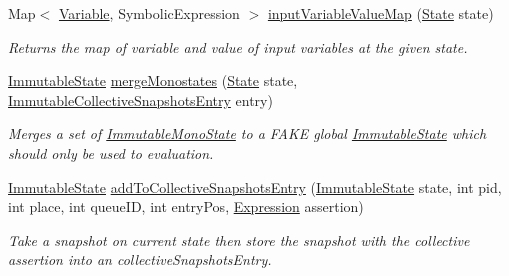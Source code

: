 \begin{DoxyCompactItemize}
\item 
Map$<$ \hyperlink{interfaceedu_1_1udel_1_1cis_1_1vsl_1_1civl_1_1model_1_1IF_1_1variable_1_1Variable}{Variable}, Symbolic\+Expression $>$ \hyperlink{interfaceedu_1_1udel_1_1cis_1_1vsl_1_1civl_1_1state_1_1IF_1_1StateFactory_a8f666801e5c6522fcdc81b508cf1e10d}{input\+Variable\+Value\+Map} (\hyperlink{interfaceedu_1_1udel_1_1cis_1_1vsl_1_1civl_1_1state_1_1IF_1_1State}{State} state)
\begin{DoxyCompactList}\small\item\em Returns the map of variable and value of input variables at the given state. \end{DoxyCompactList}\item 
\hyperlink{classedu_1_1udel_1_1cis_1_1vsl_1_1civl_1_1state_1_1common_1_1immutable_1_1ImmutableState}{Immutable\+State} \hyperlink{interfaceedu_1_1udel_1_1cis_1_1vsl_1_1civl_1_1state_1_1IF_1_1StateFactory_a71c4b5efdb8a18f3e9d6e724c0045d4f}{merge\+Monostates} (\hyperlink{interfaceedu_1_1udel_1_1cis_1_1vsl_1_1civl_1_1state_1_1IF_1_1State}{State} state, \hyperlink{classedu_1_1udel_1_1cis_1_1vsl_1_1civl_1_1state_1_1common_1_1immutable_1_1ImmutableCollectiveSnapshotsEntry}{Immutable\+Collective\+Snapshots\+Entry} entry)
\begin{DoxyCompactList}\small\item\em Merges a set of \hyperlink{}{Immutable\+Mono\+State} to a F\+A\+K\+E global \hyperlink{}{Immutable\+State} which should only be used to evaluation. \end{DoxyCompactList}\item 
\hyperlink{classedu_1_1udel_1_1cis_1_1vsl_1_1civl_1_1state_1_1common_1_1immutable_1_1ImmutableState}{Immutable\+State} \hyperlink{interfaceedu_1_1udel_1_1cis_1_1vsl_1_1civl_1_1state_1_1IF_1_1StateFactory_a7948dbf498b93bb9e67a757450dfc421}{add\+To\+Collective\+Snapshots\+Entry} (\hyperlink{classedu_1_1udel_1_1cis_1_1vsl_1_1civl_1_1state_1_1common_1_1immutable_1_1ImmutableState}{Immutable\+State} state, int pid, int place, int queue\+I\+D, int entry\+Pos, \hyperlink{interfaceedu_1_1udel_1_1cis_1_1vsl_1_1civl_1_1model_1_1IF_1_1expression_1_1Expression}{Expression} assertion)
\begin{DoxyCompactList}\small\item\em Take a snapshot on current state then store the snapshot with the collective assertion into an collective\+Snapshots\+Entry. \end{DoxyCompactList}\item 

\end{DoxyCompactItemize}
